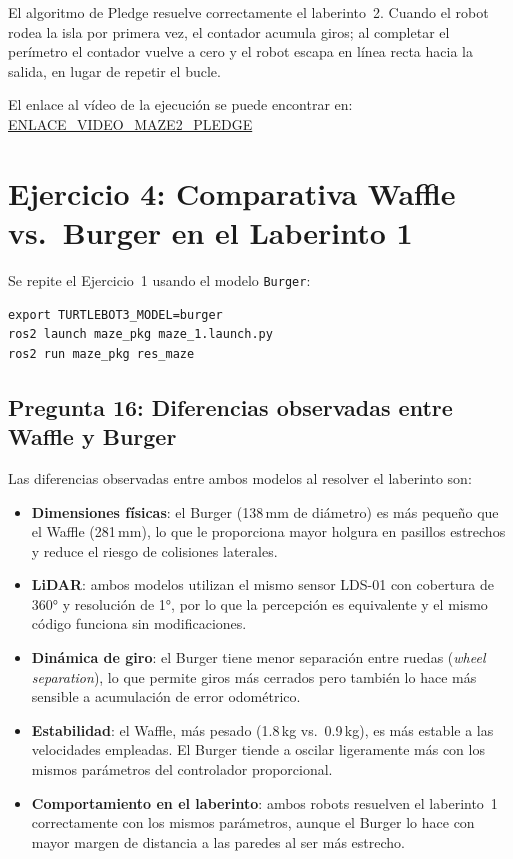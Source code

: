 El algoritmo de Pledge resuelve correctamente el laberinto~2. Cuando el robot
rodea la isla por primera vez, el contador acumula giros; al completar el
perímetro el contador vuelve a cero y el robot escapa en línea recta hacia la
salida, en lugar de repetir el bucle.

El enlace al vídeo de la ejecución se puede encontrar en: \url{ENLACE_VIDEO_MAZE2_PLEDGE}

\section{Ejercicio 4: Comparativa Waffle vs.\ Burger en el Laberinto 1}

Se repite el Ejercicio~1 usando el modelo \texttt{Burger}:

\begin{lstlisting}[style=bash]
export TURTLEBOT3_MODEL=burger
ros2 launch maze_pkg maze_1.launch.py
ros2 run maze_pkg res_maze
\end{lstlisting}

\subsection*{Pregunta 16: Diferencias observadas entre Waffle y Burger}

Las diferencias observadas entre ambos modelos al resolver el laberinto son:

\begin{itemize}
  \item \textbf{Dimensiones físicas}: el Burger (138\,mm de diámetro) es más
        pequeño que el Waffle (281\,mm), lo que le proporciona mayor holgura en
        pasillos estrechos y reduce el riesgo de colisiones laterales.
  \item \textbf{LiDAR}: ambos modelos utilizan el mismo sensor LDS-01 con
        cobertura de 360° y resolución de 1°, por lo que la percepción es
        equivalente y el mismo código funciona sin modificaciones.
  \item \textbf{Dinámica de giro}: el Burger tiene menor separación entre ruedas
        (\textit{wheel separation}), lo que permite giros más cerrados pero también
        lo hace más sensible a acumulación de error odométrico.
  \item \textbf{Estabilidad}: el Waffle, más pesado (1.8\,kg vs.\ 0.9\,kg), es
        más estable a las velocidades empleadas. El Burger tiende a oscilar
        ligeramente más con los mismos parámetros del controlador proporcional.
  \item \textbf{Comportamiento en el laberinto}: ambos robots resuelven el laberinto~1
        correctamente con los mismos parámetros, aunque el Burger lo hace con
        mayor margen de distancia a las paredes al ser más estrecho.
\end{itemize}

